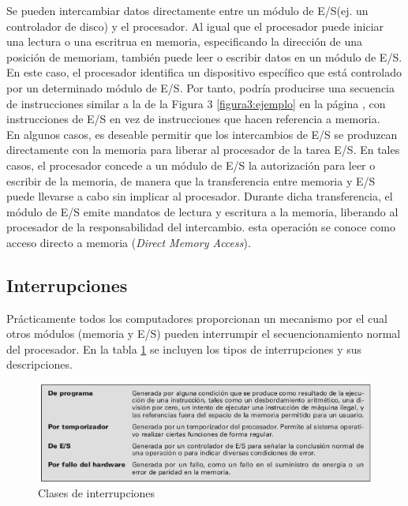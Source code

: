 \documentclass{article}
\begin{document}
					Se pueden intercambiar datos directamente entre un módulo de E/S(ej. un controlador de disco) y el procesador. Al igual que el procesador puede iniciar una lectura o una escritrua en memoria, especificando la dirección de una posición de memoriam, también puede leer o escribir datos en un módulo de E/S. En este caso, el procesador identifica un dispositivo específico que está controlado por un determinado módulo de E/S. Por tanto, podría producirse una secuencia de instrucciones similar a la de la Figura 3 \ref{figura3:ejemplo} en la página \pageref{figura3:ejemplo}, con instrucciones de E/S en vez de instrucciones que hacen referencia a memoria. \\
					
					En algunos casos, es deseable permitir que los intercambios de E/S se produzcan directamente con la memoria para liberar al procesador de la tarea E/S. En tales casos, el procesador concede a un módulo de E/S la autorización para leer o escribir de la memoria, de manera que la transferencia entre memoria y E/S puede llevarse a cabo sin implicar al procesador. Durante dicha transferencia, el módulo de E/S emite mandatos de lectura y escritura a la memoria, liberando al procesador de la responsabilidad del intercambio. esta operación se conoce como acceso directo a memoria (\textit{Direct Memory Access}).
					
			\subsection{Interrupciones}
				Prácticamente todos los computadores proporcionan un mecanismo por el cual otros módulos (memoria y E/S) pueden interrumpir el secuencionamiento normal del procesador. En la tabla \ref{figura4:interrupciones} se incluyen los tipos de interrupciones y sus descripciones.
				
				\begin{figure}
					\centering
					\caption{Clases de interrupciones}
					\label{figura4:interrupciones}
					\includegraphics[width=1\textwidth, scale=1]{figura4.png}
				\end{figure}
				
\end{document}
